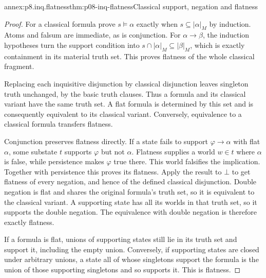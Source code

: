 \begin{annexitem}{annex:p8.inq.flatness}{thm:p08-inq-flatness}{Classical support, negation and flatness}
\begin{proof}
For a classical formula prove \(s\models\alpha\) exactly when
\(s\subseteq|\alpha|_M\) by induction. Atoms and falsum are immediate,
as is conjunction. For \(\alpha\to\beta\), the induction hypotheses
turn the support condition into
\(s\cap|\alpha|_M\subseteq|\beta|_M\), which is exactly containment
in its material truth set. This proves flatness of the whole classical
fragment.

Replacing each inquisitive disjunction by classical disjunction leaves
singleton truth unchanged, by the basic truth clauses. Thus a formula
and its classical variant have the same truth set. A flat formula is
determined by this set and is consequently equivalent to its classical
variant. Conversely, equivalence to a classical formula transfers flatness.

Conjunction preserves flatness directly. If a state fails to support
\(\varphi\to\alpha\) with flat \(\alpha\), some substate \(t\)
supports \(\varphi\) but not \(\alpha\). Flatness supplies a world
\(w\in t\) where \(\alpha\) is false, while persistence makes
\(\varphi\) true there. This world falsifies the implication. Together
with persistence this proves its flatness. Apply the result to \(\bot\)
to get flatness of every negation, and hence of the defined classical
disjunction. Double negation is flat and shares the original formula's
truth set, so it is equivalent to the classical variant. A supporting
state has all its worlds in that truth set, so it supports the double
negation. The equivalence with double negation is therefore exactly flatness.

If a formula is flat, unions of supporting states still lie in its truth
set and support it, including the empty union. Conversely, if supporting
states are closed under arbitrary unions, a state all of whose singletons
support the formula is the union of those supporting singletons and so
supports it. This is flatness.
\end{proof}
\end{annexitem}


